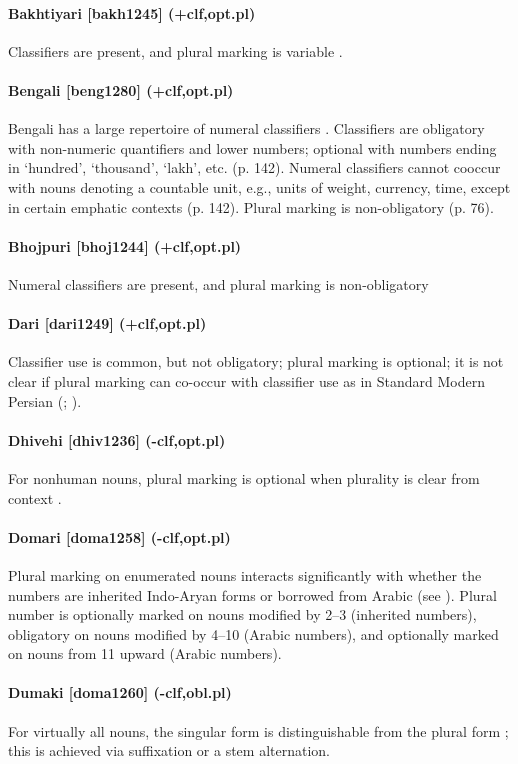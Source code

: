 \paragraph{Bakhtiyari [bakh1245] (+clf,opt.pl)}
Classifiers are present, and plural marking is variable \citep{AnonbyAsadi2014}.
\paragraph{Bengali [beng1280] (+clf,opt.pl)}
Bengali has a large repertoire of numeral classifiers \citep[135]{David2015}. Classifiers are obligatory with non-numeric quantifiers and lower numbers; optional with numbers ending in `hundred', `thousand', `lakh', etc. (p. 142). Numeral classifiers cannot cooccur with nouns denoting a countable unit, e.g., units of weight, currency, time, except in certain emphatic contexts (p. 142). Plural marking is non-obligatory (p. 76).
\paragraph{Bhojpuri [bhoj1244] (+clf,opt.pl)}
Numeral classifiers are present, and plural marking is non-obligatory \citep[120, 228, 230]{Tiwari1960}
\paragraph{Dari [dari1249] (+clf,opt.pl)}
Classifier use is common, but not obligatory; plural marking is optional; it is not clear if plural marking can co-occur with classifier use as in Standard Modern Persian (\citealt[74-5]{Kiseleva1985}; \citealt[58-9]{Ioannesjan1999}).
\paragraph{Dhivehi [dhiv1236] (-clf,opt.pl)}
For nonhuman nouns, plural marking is optional when plurality is clear from context \citep[59]{Gnanadesikan2017}.
\paragraph{Domari [doma1258] (-clf,opt.pl)}
Plural marking on enumerated nouns interacts significantly with whether the numbers are inherited Indo-Aryan forms or borrowed from Arabic (see \citealt[97, 188ff.]{Matras2012}). Plural number is optionally marked on nouns modified by 2--3 (inherited numbers), obligatory on nouns modified by 4--10 (Arabic numbers), and optionally marked on nouns from 11 upward (Arabic numbers).
\paragraph{Dumaki [doma1260] (-clf,obl.pl)}
For virtually all nouns, the singular form is distinguishable from the plural form \citep[24ff.]{Lorimer1939}; this is achieved via suffixation or a stem alternation.
